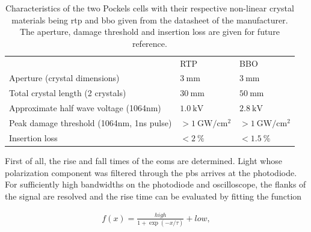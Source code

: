 \begin{table}%
\label{tbl:eom_crystals}
\centering
\begin{tabular}{p{6cm} l l}
	\toprule \toprule
                                                                                     & RTP                                       & BBO \\ \thickhline%
Aperture (crystal dimensions)                                                        & $\SI{3}{\milli\meter}$                    & $\SI{3}{\milli\meter}$   \\ \midrule
Total crystal length (2 crystals)                                                    & $\SI{30}{\milli\meter}$                   & $\SI{50}{\milli\meter}$    \\ \midrule
Approximate half wave voltage \newline (1064nm)    & $\SI{1.0}{\kilo \volt}$                   & $\SI{2.8}{\kilo\volt}$    \\ \midrule
Peak damage threshold (1064nm, \newline 1ns pulse) & $> \SI{1}{\giga \watt \per \cm \squared}$ & $> \SI{1}{\giga \watt \per \cm \squared}$   \\ \midrule
Insertion loss                                                                       & $< \SI{2}{\percent}$                      & $< \SI{1.5}{\percent} $ \\ \bottomrule \bottomrule
\end{tabular}
\caption{Characteristics of the two Pockels cells with their respective non-linear crystal materials being \ac{rtp} and \ac{bbo} given from the datasheet of the manufacturer. The aperture, damage threshold and insertion loss are given for future reference.}
\end{table}

First of all, the rise and fall times of the \acp{eom} are determined. Light whose polarization component was filtered through the \ac{pbs} arrives at the photodiode. For sufficiently high bandwidths on the photodiode and oscilloscope, the flanks of the signal are resolved and the rise time can be evaluated by fitting the function

\begin{align}
	f(x) = \frac{high}{1 + \exp{(-x/\tau)}} + low,
\end{align}

